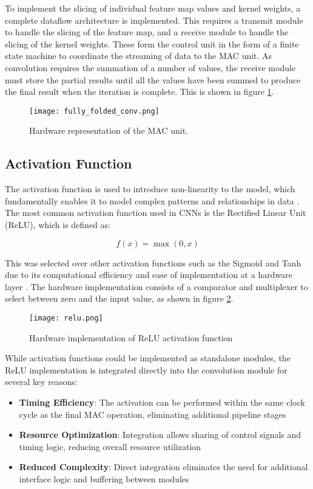 To implement the slicing of individual feature map values and kernel weights, a complete dataflow architecture is implemented.
This requires a transmit module to handle the slicing of the feature map, and a receive module to handle the slicing of the kernel weights.
These form the control unit in the form of a finite state machine to coordinate the streaming of data to the MAC unit.
As convolution requires the summation of a number of values, the receive module must store the partial results until all the values have been summed to produce the final result when the iteration is complete.
This is shown in figure \ref{fig:fully_folded}.

\begin{figure}[h]
    \centering
    \texttt{[image: fully\_folded\_conv.png]}
    \caption{Hardware representation of the MAC unit.}
    \label{fig:fully_folded}
\end{figure}

\subsection{Activation Function}
The activation function is used to introduce non-linearity to the model, which fundamentally enables it to model complex patterns and relationships in data \cite{DCNN}. The most common activation function used in CNNs is the Rectified Linear Unit (ReLU), which is defined as:
\label{sec:relu}

\begin{equation}
    f(x) = \max(0, x)
\end{equation}

This was selected over other activation functions such as the Sigmoid and Tanh due to its computational efficiency and ease of implementation at a hardware layer \cite{10}. The hardware implementation consists of a comparator and multiplexer to select between zero and the input value, as shown in figure \ref{fig:relu}.

\begin{figure}[h]
    \centering
    \texttt{[image: relu.png]}
    \caption{Hardware implementation of ReLU activation function}
    \label{fig:relu}
\end{figure}

While activation functions could be implemented as standalone modules, the ReLU implementation is integrated directly into the convolution module for several key reasons:

\begin{itemize}
    \item \textbf{Timing Efficiency}: The activation can be performed within the same clock cycle as the final MAC operation, eliminating additional pipeline stages \cite{14}
    \item \textbf{Resource Optimization}: Integration allows sharing of control signals and timing logic, reducing overall resource utilization
    \item \textbf{Reduced Complexity}: Direct integration eliminates the need for additional interface logic and buffering between modules
\end{itemize}

